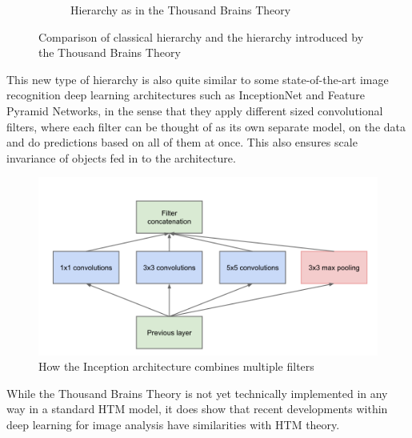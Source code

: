 \begin{figure}[H]
\begin{subfigure}[t]{0.3\textwidth}
        \caption{Hierarchy as in the Thousand Brains Theory}
        \label{}
    \end{subfigure}
    \caption{Comparison of classical hierarchy and the hierarchy introduced by the Thousand Brains Theory}
\end{figure}
This new type of hierarchy is also quite similar to some state-of-the-art image recognition deep learning architectures such as InceptionNet\cite{inceptionnet} and Feature Pyramid Networks\cite{fpn}, in the sense that they apply different sized convolutional filters, where each filter can be thought of as its own separate model, on the data and do predictions based on all of them at once. This also ensures scale invariance of objects fed in to the architecture.
\begin{figure}[H]
    \centering
    \includegraphics[width=\linewidth]{resources/models/inception_module.png}
    \caption{How the Inception \cite{inceptionnet} architecture combines multiple filters}
    \label{fig:inception_module}
\end{figure}

While the Thousand Brains Theory is not yet technically implemented in any way in a standard HTM model, it does show that recent developments within deep learning for image analysis have similarities with HTM theory.

